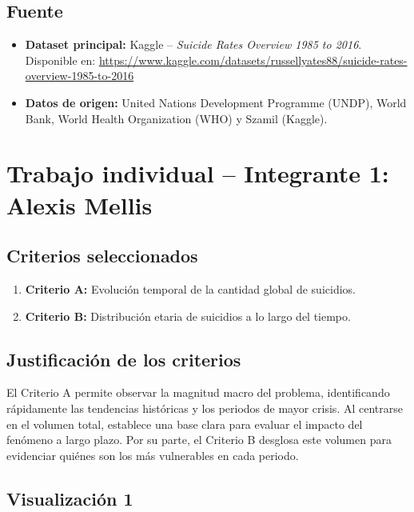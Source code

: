 \documentclass[12pt, letterpaper]{article}
\begin{document}
\subsection{Fuente}

\begin{itemize}[nosep]
  \item \textbf{Dataset principal:} Kaggle -- \textit{Suicide Rates Overview 1985 to 2016}.
        Disponible en: \url{https://www.kaggle.com/datasets/russellyates88/suicide-rates-overview-1985-to-2016}
  \item \textbf{Datos de origen:} United Nations Development Programme (UNDP), World Bank,
        World Health Organization (WHO) y Szamil (Kaggle).
\end{itemize}

\section{Trabajo individual -- Integrante 1: Alexis Mellis}

\subsection{Criterios seleccionados}

\begin{enumerate}
  \item \textbf{Criterio A:} Evolución temporal de la cantidad global de suicidios.
  \item \textbf{Criterio B:} Distribución etaria de suicidios a lo largo del tiempo.
\end{enumerate}

\subsection{Justificación de los criterios}

El Criterio A permite observar la magnitud macro del problema, identificando rápidamente las tendencias históricas y los periodos de mayor crisis. 
Al centrarse en el volumen total, establece una base clara para evaluar el impacto del fenómeno a largo plazo. Por su parte, el Criterio B desglosa este volumen para 
evidenciar quiénes son los más vulnerables en cada periodo.

\subsection{Visualización 1}
\end{document}
